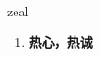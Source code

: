 
\begin{frame}
{\huge zeal}
\begin{center}
\begin{enumerate}\Large
  \item \textbf{热心，热诚}
\end{enumerate}
\end{center}
\end{frame}
